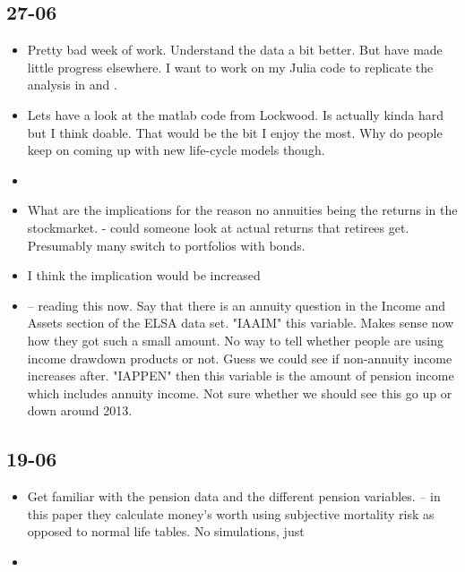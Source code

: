 \documentclass[12pt]{article}
\begin{document}
\subsection{\textbf{27-06}}
\begin{itemize}
    \item Pretty bad week of work. Understand the data a bit better.
          But have made little progress elsewhere. I want to work on my Julia code
          to replicate the analysis in \cite{odea_sturrock_rest_2023} and \cite{lockwood_red_2012}.

    \item Lets have a look at the matlab code from Lockwood. Is actually kinda hard but I think doable.
          That would be the bit I enjoy the most.
          Why do people keep on coming up with new life-cycle models though.
    \item
    \item What are the implications for the reason no annuities being the returns in the stockmarket.
          - could someone look at actual returns that retirees get. Presumably many switch to portfolios with bonds.

    \item I think the implication would be increased
    \item \cite{inkman_et_al_rfs_2011} -- reading this now. Say that there is an annuity question in the
          Income and Assets section of the ELSA data set. "IAAIM" this variable. Makes sense now how they got
          such a small amount. No way to tell whether people are using income drawdown products or not.
          Guess we could see if non-annuity income increases after.  "IAPPEN" then this variable is the amount of
          pension income which includes annuity income. Not sure whether we should see this go up or down around 2013.

\end{itemize}

\subsection{\textbf{19-06}}
\begin{itemize}
    \item Get familiar with the pension data and the different pension variables. \cite{odea_sturrock_rest_2023} -- in this paper they calculate money's
          worth using subjective mortality risk as opposed to normal life tables. No simulations, just
    \item
\end{itemize}
\end{document}
